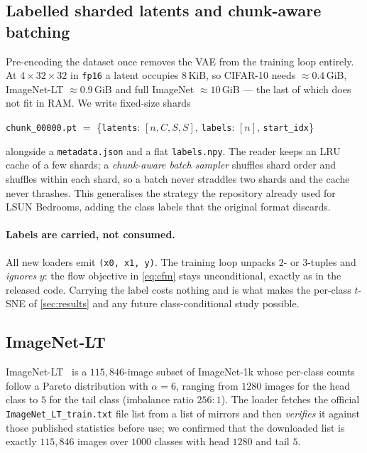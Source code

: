 \documentclass[11pt]{article}
\newcommand{\code}[1]{\texttt{\small #1}}
\begin{document}
\subsection{Labelled sharded latents and chunk-aware batching}
\label{sec:storage}

Pre-encoding the dataset once removes the VAE from the training loop entirely.
At $4\times32\times32$ in \code{fp16} a latent occupies $8$\,KiB, so CIFAR-10
needs $\approx0.4$\,GiB, ImageNet-LT $\approx0.9$\,GiB and full ImageNet
$\approx10$\,GiB --- the last of which does not fit in RAM. We write fixed-size
shards
\begin{center}\small
\code{chunk\_00000.pt} $=$ \{\code{latents}: $[n, C, S, S]$,
\code{labels}: $[n]$, \code{start\_idx}\}
\end{center}
alongside a \code{metadata.json} and a flat \code{labels.npy}. The reader keeps
an LRU cache of a few shards; a \emph{chunk-aware batch sampler} shuffles shard
order and shuffles within each shard, so a batch never straddles two shards and
the cache never thrashes. This generalises the strategy the repository already
used for LSUN Bedrooms, adding the class labels that the original format
discards.

\paragraph{Labels are carried, not consumed.}
All new loaders emit \code{(x0, x1, y)}. The training loop unpacks $2$- or
$3$-tuples and \emph{ignores} $y$: the flow objective in \cref{eq:cfm} stays
unconditional, exactly as in the released code. Carrying the label costs
nothing and is what makes the per-class $t$-SNE of \cref{sec:results} and any
future class-conditional study possible.

\subsection{ImageNet-LT}
\label{sec:imagenetlt}

ImageNet-LT~\citep{liu2019largescale} is a $115{,}846$-image subset of
ImageNet-1k whose per-class counts follow a Pareto distribution with
$\alpha = 6$, ranging from $1280$ images for the head class to $5$ for the tail
class (imbalance ratio $256{:}1$). The loader fetches the official
\code{ImageNet\_LT\_train.txt} file list from a list of mirrors and then
\emph{verifies} it against those published statistics before use; we confirmed
that the downloaded list is exactly $115{,}846$ images over $1000$ classes with
head $1280$ and tail $5$.
\end{document}
